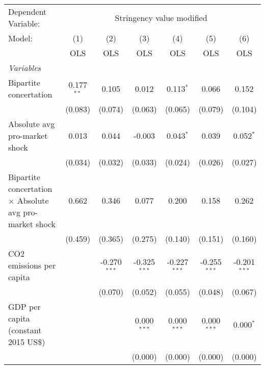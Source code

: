 
\begingroup
\centering
\begin{tabular}{lcccccc}
   \toprule
   Dependent Variable: & \multicolumn{6}{c}{Stringency value modified}\\
   Model:                                                         & (1)          & (2)            & (3)            & (4)            & (5)            & (6)\\  
                                                                  &  OLS         & OLS            & OLS            & OLS            & OLS            & OLS\\  
   \midrule
   \emph{Variables}\\
   Bipartite concertation                                         & 0.177$^{**}$ & 0.105          & 0.012          & 0.113$^{*}$    & 0.066          & 0.152\\   
                                                                  & (0.083)      & (0.074)        & (0.063)        & (0.065)        & (0.079)        & (0.104)\\   
   Absolute avg pro-market shock                                  & 0.013        & 0.044          & -0.003         & 0.043$^{*}$    & 0.039          & 0.052$^{*}$\\   
                                                                  & (0.034)      & (0.032)        & (0.033)        & (0.024)        & (0.026)        & (0.027)\\   
   Bipartite concertation $\times$ Absolute avg pro-market shock  & 0.662        & 0.346          & 0.077          & 0.200          & 0.158          & 0.262\\   
                                                                  & (0.459)      & (0.365)        & (0.275)        & (0.140)        & (0.151)        & (0.160)\\   
   CO2 emissions per capita                                       &              & -0.270$^{***}$ & -0.325$^{***}$ & -0.227$^{***}$ & -0.255$^{***}$ & -0.201$^{***}$\\   
                                                                  &              & (0.070)        & (0.052)        & (0.055)        & (0.048)        & (0.067)\\   
   GDP per capita (constant 2015 US\$)                            &              &                & 0.000$^{***}$  & 0.000$^{***}$  & 0.000$^{***}$  & 0.000$^{*}$\\   
                                                                  &              &                & (0.000)        & (0.000)        & (0.000)        & (0.000)\\   

\end{tabular}
